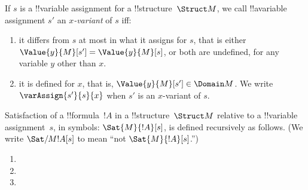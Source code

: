 \documentclass[../../../../include/open-logic-chapter]{subfiles}
\begin{document}
\begin{defn}[$x$-Variant]
If $s$ is a !!{variable} assignment for a !!{structure}~$\Struct M$, we
call !!a{variable} assignment $s'$ an \emph{$x$-variant} of $s$ iff:
\begin{enumerate}
\item it differs from $s$ at most in what it assigns for $s$, that is 
either $\Value{y}{M}[s'] = \Value{y}{M}[s]$, or both are undefined, for
any variable $y$ other than $x$.
\item it is defined for $x$, that is, $\Value{y}{M}[s'] \in \Domain M$.
We write $\varAssign{s'}{s}{x}$ when $s'$ is an $x$-variant of $s$.
\end{enumerate}
\end{defn}

\begin{defn}[Satisfaction]
Satisfaction of a !!{formula}~$!A$ in a !!{structure}~$\Struct M$
relative to a !!{variable} assignment~$s$, in symbols:
$\Sat{M}{!A}[s]$, is defined recursively as follows. (We write
$\Sat/{M}{!A}[s]$ to mean ``not $\Sat{M}{!A}[s]$.'')
\begin{enumerate}


\item {}

\item {}

\item {}





\end{enumerate}
\end{defn}
\end{document}
